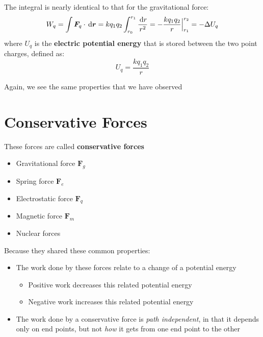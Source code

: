 The integral is nearly identical to that for the gravitational force:
\begin{equation}
  W_q=\int\bm F_q\cdot\dl{\bm r}
  =kq_1q_2\int_{r_0}^{r_1}\frac{\dl r}{r^2}
  =-\frac{kq_1q_2} r\Big|^{r_2}_{r_1}=-\Delta U_q
\end{equation}
where $U_q$ is the \textbf{electric potential energy} that is stored between
the two point charges, defined as:
\begin{equation}
  \boxed{
    U_q = \frac{kq_1q_2}r
  }
\end{equation}

Again, we see the same properties that we have observed 



\section{Conservative Forces}

These forces are called \textbf{conservative forces}
\begin{itemize}[nosep]
\item Gravitational force $\bm F_g$
\item Spring force $\bm F_e$
\item Electrostatic force $\bm F_q$
\item Magnetic force $\bm F_m$
\item Nuclear forces
\end{itemize}
Because they shared these common properties:
\begin{itemize}[nosep]
\item The work done by these forces relate to a change of a potential energy
  \begin{itemize}[nosep]
  \item Positive work decreases this related potential energy
  \item Negative work increases this related potential energy
  \end{itemize}
\item The work done by a conservative force is \emph{path independent}, in that
  it depends only on end points, but not \emph{how} it gets from one end point
  to the other
\end{itemize}



